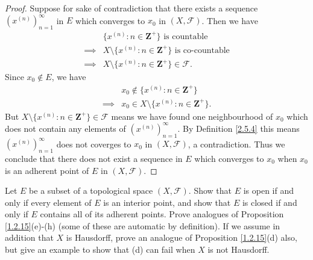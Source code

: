 \begin{proof}
    Suppose for sake of contradiction that there exists a sequence \((x^{(n)})_{n = 1}^\infty\) in \(E\) which converges to \(x_0\) in \((X, \mathcal{F})\).
    Then we have
    \begin{align*}
                 & \{x^{(n)} : n \in \mathbf{Z}^+\} \text{ is countable}                \\
        \implies & X \setminus \{x^{(n)} : n \in \mathbf{Z}^+\} \text{ is co-countable} \\
        \implies & X \setminus \{x^{(n)} : n \in \mathbf{Z}^+\} \in \mathcal{F}.
    \end{align*}
    Since \(x_0 \notin E\), we have
    \begin{align*}
                 & x_0 \notin \{x^{(n)} : n \in \mathbf{Z}^+\}           \\
        \implies & x_0 \in X \setminus \{x^{(n)} : n \in \mathbf{Z}^+\}.
    \end{align*}
    But \(X \setminus \{x^{(n)} : n \in \mathbf{Z}^+\} \in \mathcal{F}\) means we have found one neighbourhood of \(x_0\) which does not contain any elements of \((x^{(n)})_{n = 1}^\infty\).
    By Definition \ref{2.5.4} this means \((x^{(n)})_{n = 1}^\infty\) does not coverges to \(x_0\) in \((X, \mathcal{F})\), a contradiction.
    Thus we conclude that there does not exist a sequence in \(E\) which converges to \(x_0\) when \(x_0\) is an adherent point of \(E\) in \((X, \mathcal{F})\).
\end{proof}

\begin{exercise}\label{ex 2.5.11}
    Let \(E\) be a subset of a topological space \((X, \mathcal{F})\).
    Show that \(E\) is open if and only if every element of \(E\) is an interior point, and show that \(E\) is closed if and only if \(E\) contains all of its adherent points.
    Prove analogues of Proposition \ref{1.2.15}(e)-(h) (some of these are automatic by definition).
    If we assume in addition that \(X\) is Hausdorff, prove an analogue of Proposition \ref{1.2.15}(d) also, but give an example to show that (d) can fail when \(X\) is not Hausdorff.
\end{exercise}

